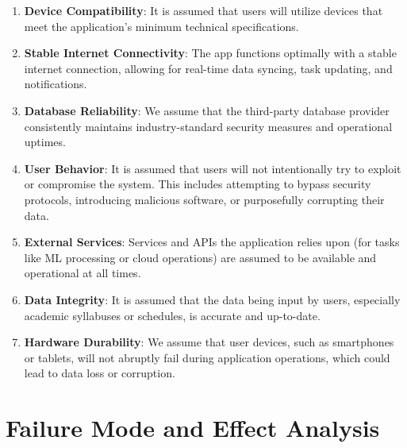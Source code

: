 \documentclass{article}
\begin{document}
\begin{enumerate}
    \item \textbf{Device Compatibility}: It is assumed that users will utilize devices that meet the application's minimum technical specifications.
    \item \textbf{Stable Internet Connectivity}: The app functions optimally with a stable internet connection, allowing for real-time data syncing, task updating, and notifications.
    \item \textbf{Database Reliability}: We assume that the third-party database provider consistently maintains industry-standard security measures and operational uptimes.
    \item \textbf{User Behavior}: It is assumed that users will not intentionally try to exploit or compromise the system. This includes attempting to bypass security protocols, introducing malicious software, or purposefully corrupting their data.
    \item \textbf{External Services}: Services and APIs the application relies upon (for tasks like ML processing or cloud operations) are assumed to be available and operational at all times.
    \item \textbf{Data Integrity}: It is assumed that the data being input by users, especially academic syllabuses or schedules, is accurate and up-to-date.
    \item \textbf{Hardware Durability}: We assume that user devices, such as smartphones or tablets, will not abruptly fail during application operations, which could lead to data loss or corruption.
\end{enumerate}

\clearpage %

\section{Failure Mode and Effect Analysis}
\end{document}
